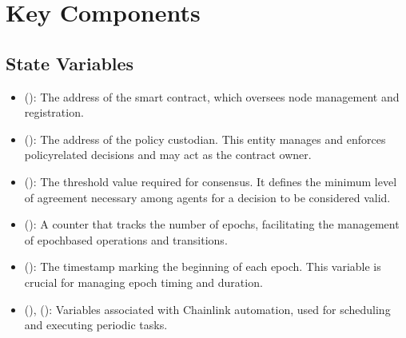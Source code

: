\documentclass[letterpaper,10pt,english]{sphinxmanual}
\begin{document}
\section{Key Components}
\label{\detokenize{docs_consensus_mechanism_contract:key-components}}

\subsection{State Variables}
\label{\detokenize{docs_consensus_mechanism_contract:state-variables}}\begin{itemize}
\item {} 
\sphinxAtStartPar
{} ():
The address of the  smart contract, which oversees node management and registration.

\item {} 
\sphinxAtStartPar
{} ():
The address of the policy custodian. This entity manages and enforces policy\sphinxhyphen{}related decisions and may act as the contract owner.

\item {} 
\sphinxAtStartPar
{} ():
The threshold value required for consensus. It defines the minimum level of agreement necessary among agents for a decision to be considered valid.

\item {} 
\sphinxAtStartPar
{} ():
A counter that tracks the number of epochs, facilitating the management of epoch\sphinxhyphen{}based operations and transitions.

\item {} 
\sphinxAtStartPar
{} ():
The timestamp marking the beginning of each epoch. This variable is crucial for managing epoch timing and duration.

\item {} 
\sphinxAtStartPar
{} (),  ():
Variables associated with Chainlink automation, used for scheduling and executing periodic tasks.


\end{itemize}
\end{document}
